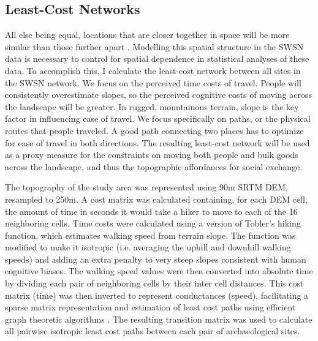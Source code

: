 \documentclass[10pt]{iopart}
\begin{document}
\subsection*{Least-Cost Networks}
All else being equal, locations that are closer together in space will be more similar than those further apart \parencite{Tobler1970}. Modelling this spatial structure in the SWSN data is necessary to control for spatial dependence in statistical analyses of these data. To accomplish this, I calculate the least-cost network between all sites in the SWSN network. We focus on the perceived time costs of travel. People will consistently overestimate slopes, so the perceived cognitive costs of moving across the landscape will be greater. In rugged, mountainous terrain, slope is the key factor in influencing ease of travel. We focus specifically on paths, or the physical routes that people traveled. A good path connecting two places has to optimize for ease of travel in both directions. The resulting least-cost network will be used as a proxy measure for the constraints on moving both people and bulk goods across the landscape, and thus the topographic affordances for social exchange.

The topography of the study area was represented using 90m SRTM DEM, resampled to 250m. A cost matrix was calculated containing, for each DEM cell, the amount of time in seconds it would take a hiker to move to each of the 16 neighboring cells. Time costs were calculated using a version of Tobler's hiking function, which estimates walking speed from terrain slope. The function was modified to make it isotropic (i.e. averaging the uphill and downhill walking speeds) and adding an extra penalty to very steep slopes consistent with human cognitive biases. The walking speed values were then converted into absolute time by dividing each pair of neighboring cells by their inter cell distances. This cost matrix (time) was then inverted to represent conductances (speed), facilitating a sparse matrix representation and estimation of least cost paths using efficient graph theoretic algorithms \parencite{vanetten2014}. The resulting transition matrix was used to calculate all pairwise isotropic least cost paths between each pair of archaeological sites. 
\end{document}
